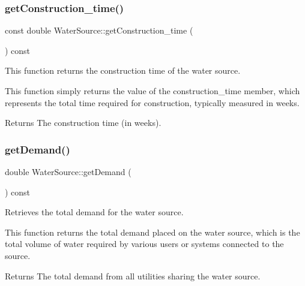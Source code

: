 \subsubsection{\texorpdfstring{get\+Construction\+\_\+time()}{getConstruction\_time()}}
{\footnotesize\ttfamily const double Water\+Source\+::get\+Construction\+\_\+time (\begin{DoxyParamCaption}{ }\end{DoxyParamCaption}) const}



This function returns the construction time of the water source. 

This function simply returns the value of the {\ttfamily construction\+\_\+time} member, which represents the total time required for construction, typically measured in weeks.

\begin{DoxyReturn}{Returns}
The construction time (in weeks). 
\end{DoxyReturn}
\mbox{\label{classWaterSource_ac57d6b292490333b5bc14233bce326ce}} 
\subsubsection{\texorpdfstring{get\+Demand()}{getDemand()}}
{\footnotesize\ttfamily double Water\+Source\+::get\+Demand (\begin{DoxyParamCaption}{ }\end{DoxyParamCaption}) const}



Retrieves the total demand for the water source. 

This function returns the total demand placed on the water source, which is the total volume of water required by various users or systems connected to the source.

\begin{DoxyReturn}{Returns}
The total demand from all utilities sharing the water source. 
\end{DoxyReturn}
\mbox{\label{classWaterSource_a00b156a153fc24097e4c8a4e5c46c4e0}} 
